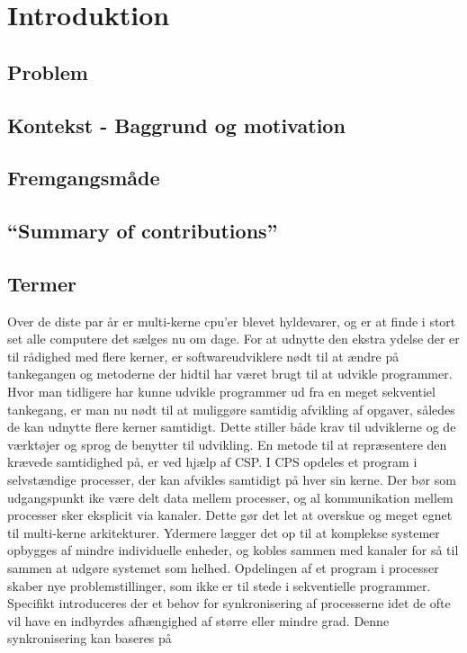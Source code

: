 \chapter{Introduktion}
  \section{Problem}	 
  \section{Kontekst - Baggrund og motivation}
  \section{Fremgangsmåde}
  \section{``Summary of contributions''}
  \section{Termer}



Over de diste par år er multi-kerne cpu'er blevet hyldevarer, og er at finde i 
stort set alle computere det sælges nu om dage. For at udnytte den ekstra 
ydelse der er til rådighed med flere kerner, er softwareudviklere nødt til at 
ændre på tankegangen og metoderne der hidtil har været brugt til at udvikle 
programmer. Hvor man tidligere har kunne udvikle programmer ud fra en meget 
sekventiel tankegang, er man nu nødt til at muliggøre samtidig afvikling af 
opgaver, således de kan udnytte flere kerner samtidigt. Dette stiller både krav 
til udviklerne og de værktøjer og sprog de benytter til udvikling.  En metode 
til at repræsentere den krævede samtidighed på, er ved hjælp af 
CSP\cite{hoare-csp}.  I CPS opdeles et program i selvstændige processer, der 
kan afvikles samtidigt på hver sin kerne. Der bør som udgangspunkt ike være 
delt data mellem processer, og al kommunikation mellem processer sker eksplicit 
via kanaler. Dette gør det let at overskue og meget egnet til multi-kerne 
arkitekturer. Ydermere lægger det op til at komplekse systemer opbygges af 
mindre individuelle enheder, og kobles sammen med kanaler for så til sammen at 
udgøre systemet som helhed.
Opdelingen af et program i processer skaber nye problemstillinger, som ikke er 
til stede i sekventielle programmer. Specifikt introduceres der et behov for 
synkronisering af processerne idet de ofte vil have en indbyrdes afhængighed af 
større eller mindre grad. Denne synkronisering kan baseres på 


